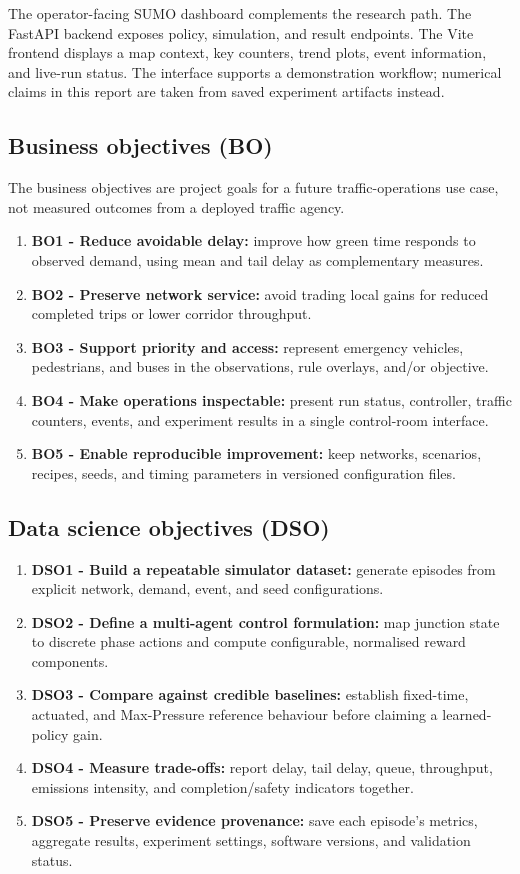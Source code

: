 \documentclass[11pt,a4paper]{article}
\begin{document}
The operator-facing SUMO dashboard complements the research path. The FastAPI
backend exposes policy, simulation, and result endpoints. The Vite frontend displays a
map context, key counters, trend plots, event information, and live-run status. The
interface supports a demonstration workflow; numerical claims in this report are taken
from saved experiment artifacts instead.

\subsection{Business objectives (BO)}
The business objectives are project goals for a future traffic-operations use case, not
measured outcomes from a deployed traffic agency.
\begin{enumerate}
  \item \textbf{BO1 - Reduce avoidable delay:} improve how green time responds to
  observed demand, using mean and tail delay as complementary measures.
  \item \textbf{BO2 - Preserve network service:} avoid trading local gains for reduced
  completed trips or lower corridor throughput.
  \item \textbf{BO3 - Support priority and access:} represent emergency vehicles,
  pedestrians, and buses in the observations, rule overlays, and/or objective.
  \item \textbf{BO4 - Make operations inspectable:} present run status, controller,
  traffic counters, events, and experiment results in a single control-room interface.
  \item \textbf{BO5 - Enable reproducible improvement:} keep networks, scenarios,
  recipes, seeds, and timing parameters in versioned configuration files.
\end{enumerate}

\subsection{Data science objectives (DSO)}
\begin{enumerate}
  \item \textbf{DSO1 - Build a repeatable simulator dataset:} generate episodes from
  explicit network, demand, event, and seed configurations.
  \item \textbf{DSO2 - Define a multi-agent control formulation:} map junction state to
  discrete phase actions and compute configurable, normalised reward components.
  \item \textbf{DSO3 - Compare against credible baselines:} establish fixed-time,
  actuated, and Max-Pressure reference behaviour before claiming a learned-policy gain.
  \item \textbf{DSO4 - Measure trade-offs:} report delay, tail delay, queue, throughput,
  emissions intensity, and completion/safety indicators together.
  \item \textbf{DSO5 - Preserve evidence provenance:} save each episode's metrics,
  aggregate results, experiment settings, software versions, and validation status.
\end{enumerate}
\end{document}
